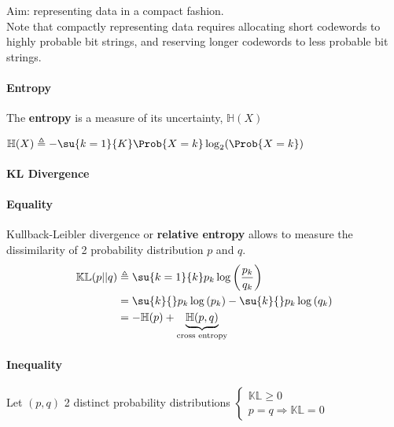 Aim: representing data in a compact fashion.\\
Note that compactly representing data requires allocating short codewords to 
highly probable bit strings, and reserving longer codewords to less probable
bit strings.

\paragraph{Entropy}
The \textbf{entropy} is a measure of its uncertainty, $\mathbb{H}(X)$
\begin{center}
	$\mathbb{H}(X) \triangleq - \su{{k=1}}{K}\Prob{X=k}\log_{2}(
	\Prob{X=k})$
\end{center}

\paragraph{KL Divergence}
\paragraph{Equality}
Kullback-Leibler divergence or \textbf{relative entropy} allows to measure
the dissimilarity of 2 probability distribution $p$ and $q$.\\
\begin{align*}
	\mathbb{KL}(p||q) &\triangleq \su{{k=1}}{k}p_{k}\log\left(
\dfrac{p_{k}}{q_{k}}\right)\\
	&= \su{k}{}p_{k}\log\left(p_{k}\right) - \su{k}{}p_{k}\log\left(q_{k}
	\right)\\
	&=  -\mathbb{H}(p) + \underbrace{\mathbb{H}(p,q)}_{\text{cross 
	entropy}}
\end{align*}


\paragraph{Inequality}
Let $(p,q)$ 2 distinct probability distributions 
$\begin{cases}
	\mathbb{KL} \geq 0 \\
	p=q \Rightarrow \mathbb{KL} = 0
\end{cases}$
